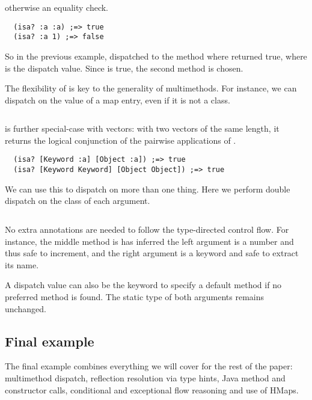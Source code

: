 otherwise an equality check.

\begin{verbatim}
  (isa? :a :a) ;=> true
  (isa? :a 1) ;=> false
\end{verbatim}

So in the previous example,  dispatched to the method
where  returned true, where  is the dispatch value.
Since  is true, the second method is chosen.

The flexibility of  is key to the generality of multimethods. 
For instance, we can dispatch on the value of
a map entry, even if it is not a class.

\inputminted[firstline=4,lastline=23]{clojure}{code/demo/src/demo/eg5.clj}

 is further special-case with vectors: with two vectors of the
same length, it returns the logical conjunction of the pairwise applications
of .

\begin{verbatim}
  (isa? [Keyword :a] [Object :a]) ;=> true
  (isa? [Keyword Keyword] [Object Object]) ;=> true
\end{verbatim}

We can use this to dispatch on more than one thing. Here we perform
double dispatch on the class of each argument.

\inputminted[firstline=6,lastline=23]{clojure}{code/demo/src/demo/eg7.clj}

No extra annotations are needed to follow the type-directed control flow.
For instance, the middle method is has inferred the left argument is a number
and thus safe to increment, and the right argument is a keyword and safe to
extract its name.

A dispatch value can also be the keyword  to specify a default
method if no preferred method is found. The static type of both arguments
remains unchanged.

\subsection{Final example}

The final example combines everything we will cover for the rest of the paper:
multimethod dispatch, reflection resolution via type hints, Java method
and constructor calls, conditional and exceptional flow reasoning
and use of HMaps.

\inputminted[firstline=6,lastline=20]{clojure}{code/demo/src/demo/eg8.clj}






